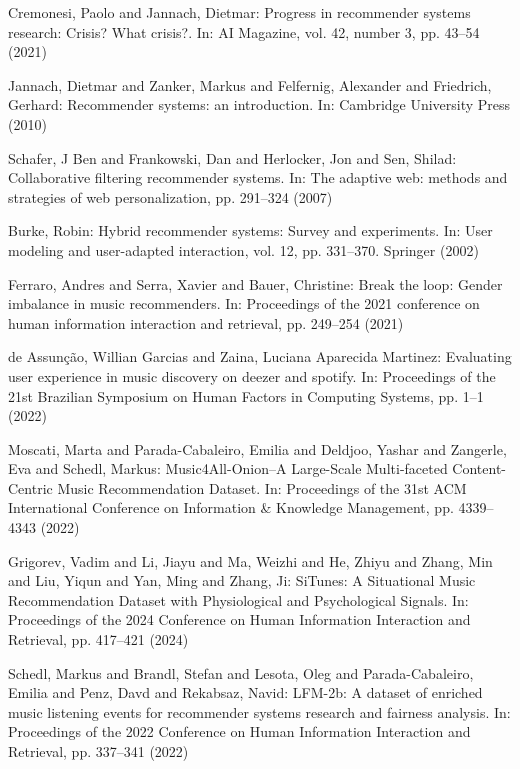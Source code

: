 \documentclass[runningheads,a4paper]{llncs}
\begin{document}
\begin{thebibliography}{4}
 Cremonesi, Paolo and Jannach, Dietmar: Progress in recommender systems research: Crisis? What crisis?. In:
AI Magazine, vol. 42, number 3, pp. 43--54 (2021)

 Jannach, Dietmar and Zanker, Markus and Felfernig, Alexander and Friedrich, Gerhard: 
Recommender systems: an introduction. In: Cambridge University Press (2010)

 Schafer, J Ben and Frankowski, Dan and Herlocker, Jon and Sen, Shilad:
Collaborative filtering recommender systems. In: The adaptive web: methods and strategies of web personalization,
pp. 291--324 (2007)

 Burke, Robin: Hybrid recommender systems: Survey and experiments. In:
User modeling and user-adapted interaction, vol. 12, pp. 331--370. Springer (2002)

 Ferraro, Andres and Serra, Xavier and Bauer, Christine:
Break the loop: Gender imbalance in music recommenders. In:
Proceedings of the 2021 conference on human information interaction and retrieval,
pp. 249--254 (2021)

 de Assun{\c{c}}{\~a}o, Willian Garcias and Zaina, Luciana Aparecida Martinez:
Evaluating user experience in music discovery on deezer and spotify. In:
Proceedings of the 21st Brazilian Symposium on Human Factors in Computing Systems, pp. 1--1 (2022)

 Moscati, Marta and Parada-Cabaleiro, Emilia and Deldjoo, Yashar and Zangerle, Eva and Schedl, Markus:
Music4All-Onion--A Large-Scale Multi-faceted Content-Centric Music Recommendation Dataset. In:
Proceedings of the 31st ACM International Conference on Information \& Knowledge Management, pp. 4339--4343 (2022)

 Grigorev, Vadim and Li, Jiayu and Ma, Weizhi and He, Zhiyu and Zhang, Min and Liu, Yiqun and Yan, Ming and Zhang, Ji:
SiTunes: A Situational Music Recommendation Dataset with Physiological and Psychological Signals. In: Proceedings of the 2024 Conference on Human Information Interaction and Retrieval,
pp. 417--421 (2024)

 Schedl, Markus and Brandl, Stefan and Lesota, Oleg and Parada-Cabaleiro, Emilia and Penz, Davd and Rekabsaz, Navid:
LFM-2b: A dataset of enriched music listening events for recommender systems research and fairness analysis. In:
Proceedings of the 2022 Conference on Human Information Interaction and Retrieval, pp. 337--341 (2022)


\end{thebibliography}
\end{document}
